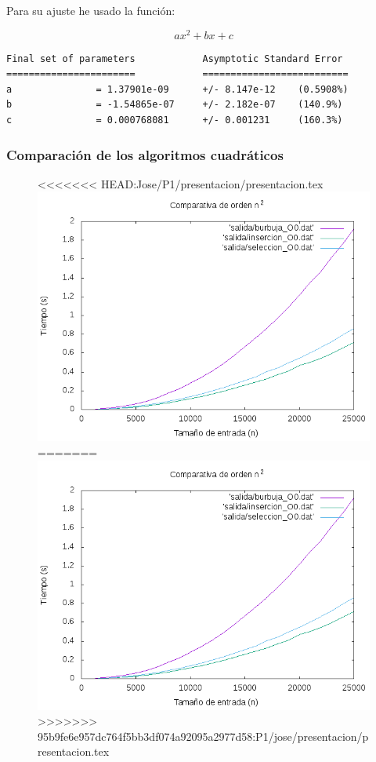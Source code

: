 \documentclass[spanish]{beamer}
\begin{document}
\begin{frame}[fragile]
  Para su ajuste he usado la función:

  $$ax^2+bx+c$$
  
\scriptsize
\begin{verbatim}
Final set of parameters            Asymptotic Standard Error
=======================            ==========================
a               = 1.37901e-09      +/- 8.147e-12    (0.5908%)
b               = -1.54865e-07     +/- 2.182e-07    (140.9%)
c               = 0.000768081      +/- 0.001231     (160.3%)
\end{verbatim}
  
\end{frame}

%
%

\begin{frame}\frametitle{Comparación de los algoritmos cuadráticos}
  \begin{figure}[H]
    \centering   
<<<<<<< HEAD:Jose/P1/presentacion/presentacion.tex
        \includegraphics[clip,width=1\columnwidth]{../plots/cuadraticos_O0.png}%
=======
        \includegraphics[clip,width=0.8\columnwidth]{../plots/cuadraticos_O0.png}%
>>>>>>> 95b9fe6e957dc764f5bb3df074a92095a2977d58:P1/jose/presentacion/presentacion.tex
    \end{figure}
  \end{frame}
\end{document}
